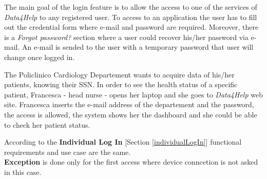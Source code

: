 The main goal of the login feature is to allow the access to one of the services of \textit{Data4Help} to any registered user. To access to an application the user has to fill out the credential form where e-mail and password are required. Moreover, there is a \textit{Forgot password?} section where a user could recover his/her password via e-mail. An e-mail is sended to the user with a temporary password that user will change once logged in.

The Policlinico Cardiology Departement wants to acquire data of his/her patients, knowing their SSN.
In order to see the health status of a specific patient, Francesca - head nurse - opens her laptop and she goes to \textit{Data4Help} web site.
Francesca inserts the e-mail address of the departement and the password, the access is allowed, the system shows her the dashboard and she could be able to check her patient status.

According to the \textbf{Individual Log In} [Section \ref{individualLogIn}] functional requirements and use case are the same.\\
\textbf{Exception} is done only for the first access where device conncetion is not asked in this case.
